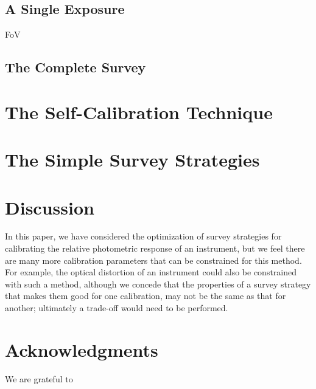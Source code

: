 \documentclass[manuscript]{aastex}
\begin{document}
\subsection{A Single Exposure}
FoV

\subsection{The Complete Survey}


\section{The Self-Calibration Technique}
\label{sec:self_cal}

\section{The Simple Survey Strategies}
\label{sec:simple}

\section{Discussion}
In this paper, we have considered the optimization of survey strategies for calibrating the relative photometric response of an instrument, but we feel there are many more calibration parameters that can be constrained for this method. For example, the optical distortion of an instrument could also be constrained with such a method, although we concede that the properties of a survey strategy that makes them good for one calibration, may not be the same as that for another; ultimately a trade-off would need to be performed. 







\acknowledgments
\section{Acknowledgments}
We are grateful to 
\end{document}
